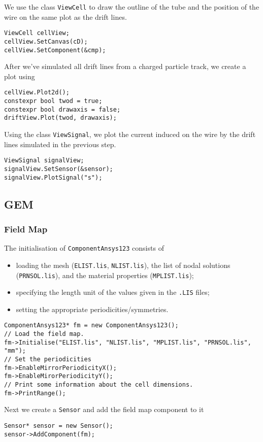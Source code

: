 We use the class \texttt{ViewCell} to draw the
outline of the tube and the position of the wire on the same plot as the
drift lines.
\begin{lstlisting}
ViewCell cellView;
cellView.SetCanvas(cD);
cellView.SetComponent(&cmp);
\end{lstlisting}
After we've simulated all drift lines from a charged particle 
track, we create a plot using
\begin{lstlisting}
cellView.Plot2d();
constexpr bool twod = true;
constexpr bool drawaxis = false;
driftView.Plot(twod, drawaxis);
\end{lstlisting}

Using the class \texttt{ViewSignal}, we plot the current induced on 
the wire by the drift lines simulated in the previous step.
\begin{lstlisting}
ViewSignal signalView;
signalView.SetSensor(&sensor);
signalView.PlotSignal("s");
\end{lstlisting}

\subsection{GEM}\label{Sec:ExampleGem}

\subsubsection{Field Map}

The initialisation of \texttt{ComponentAnsys123} consists of 
\begin{itemize}
  \item
  loading the mesh (\texttt{ELIST.lis}, \texttt{NLIST.lis}), 
  the list of nodal solutions (\texttt{PRNSOL.lis}), and the 
  material properties (\texttt{MPLIST.lis});
  \item
  specifying the length unit of the values given in the 
  \texttt{.LIS} files;
  \item
  setting the appropriate periodicities/symmetries.
\end{itemize}
\begin{lstlisting}
ComponentAnsys123* fm = new ComponentAnsys123();
// Load the field map.
fm->Initialise("ELIST.lis", "NLIST.lis", "MPLIST.lis", "PRNSOL.lis", "mm");
// Set the periodicities
fm->EnableMirrorPeriodicityX();
fm->EnableMirorPeriodicityY();
// Print some information about the cell dimensions.
fm->PrintRange();
\end{lstlisting}

Next we create a \texttt{Sensor} and add the field map 
component to it
\begin{lstlisting}
Sensor* sensor = new Sensor();
sensor->AddComponent(fm);
\end{lstlisting}

